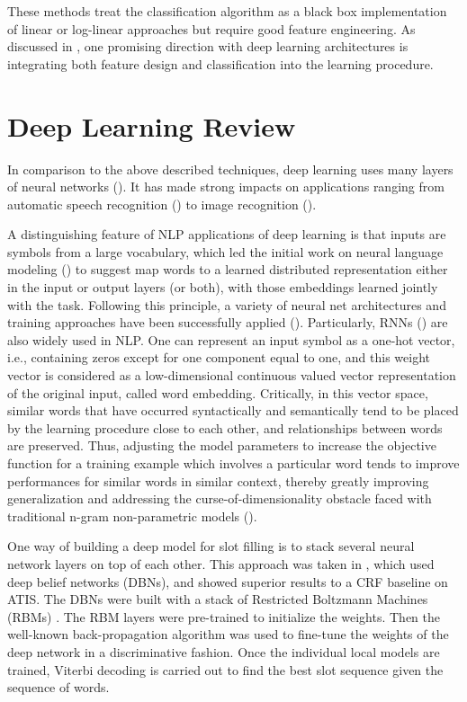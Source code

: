 These methods treat the classification algorithm as a black box implementation
of linear or log-linear approaches but require good feature engineering. As
discussed in \cite{rnn57,rnn13}, one promising direction with deep learning architectures
is integrating both feature design and classification into the learning
procedure.

\section{Deep Learning Review}
\label{sec:deepreview}

In comparison to the above described techniques, deep learning uses many layers
of neural networks (\cite{rnn57}). It has made strong impacts on applications ranging
from automatic speech recognition (\cite{rnn8}) to image recognition (\cite{rnn10}). 

A distinguishing feature of NLP applications of deep learning is that inputs
are symbols from a large vocabulary, which led the initial work on neural
language modeling (\cite{rnn26}) to suggest map words to a learned distributed
representation either in the input or output layers (or both), with those
embeddings learned jointly with the task. Following this principle, a variety
of neural net architectures and training approaches have been successfully
applied (\cite{rnn11,rnn13,rnn20,rnn22,rnn23,rnn39,rnn49,rnn58,rnn59,rnn60,rnn61}). Particularly, RNNs (\cite{rnn22,rnn23,rnn49}) are
also widely used in NLP. One can represent an input symbol as a one-hot vector,
i.e., containing zeros except for one component equal to one, and this weight
vector is considered as a low-dimensional continuous valued vector
representation of the original input, called word embedding. Critically, in
this vector space, similar words that have occurred syntactically and
semantically tend to be placed by the learning procedure close to each other,
and relationships between words are preserved. Thus, adjusting the model
parameters to increase the objective function for a training example which
involves a particular word tends to improve performances for similar words in
similar context, thereby greatly improving generalization and addressing the
curse-of-dimensionality obstacle faced with traditional n-gram non-parametric
models (\cite{rnn26}).

One way of building a deep model for slot filling is to stack several neural
network layers on top of each other. This approach was taken in \cite{rnn27}, which
used deep belief networks (DBNs), and showed superior results to a CRF baseline
on ATIS. The DBNs were built with a stack of Restricted Boltzmann Machines
(RBMs) \cite{rnn12}. The RBM layers were pre-trained to initialize the weights. Then
the well-known back-propagation algorithm was used to fine-tune the weights of
the deep network in a discriminative fashion. Once the individual local models
are trained, Viterbi decoding is carried out to find the best slot sequence
given the sequence of words. 

